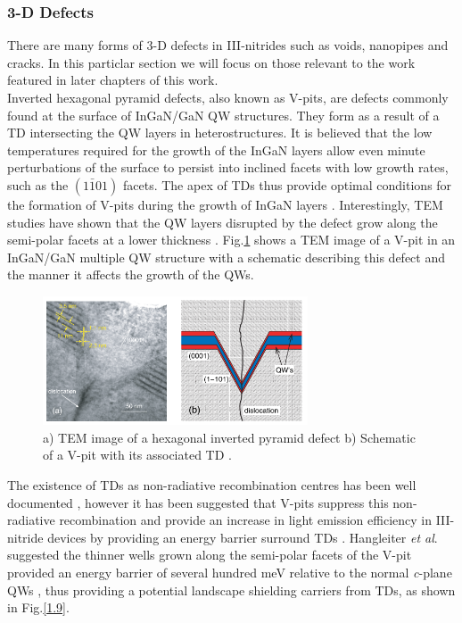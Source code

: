 \subsubsection{3-D Defects}
\label{v-pit section}
There are many forms of 3-D defects in III-nitrides such as voids, nanopipes and cracks. In this particlar section we will focus on those relevant to the work featured in later chapters of this work.\\
Inverted hexagonal pyramid defects, also known as V-pits, are defects commonly found at the surface of InGaN/GaN QW structures. They form as a result of a TD intersecting the QW layers in heterostructures. It is believed that the low temperatures required for the growth of the InGaN layers allow even minute perturbations of the surface to persist into inclined facets with low growth rates, such as the $(1\bar{1}01)$ facets. The apex of TDs thus provide optimal conditions for the formation of V-pits during the growth of InGaN layers \cite{Hangleiter2005}. Interestingly, TEM studies have shown that the QW layers disrupted by the defect grow along the semi-polar facets at a lower thickness \cite{Hangleiter2005,Han2013,Tsai2007}. Fig.\ref{1.8} shows a TEM image of a V-pit in an InGaN/GaN multiple QW structure with a schematic describing this defect and the manner it affects the growth of the QWs.

\begin{figure}[h]
	\centering
	\includegraphics[width=0.7\textwidth]{Figs/Ch1/vpit.png}
	\caption {a) TEM image of a hexagonal inverted pyramid defect b) Schematic  of a V-pit with its associated TD \cite{Hangleiter2005}.}
	\label{1.8}
\end{figure}
\FloatBarrier 

The existence of TDs as non-radiative recombination centres has been well documented \cite{Bennett2010b}, however it has been suggested that V-pits suppress this non-radiative recombination and provide an increase in light emission efficiency in III-nitride devices by providing an energy barrier surround TDs \cite{Hangleiter2005}. Hangleiter {\it et al}. suggested the thinner wells grown along the semi-polar facets of the V-pit provided an energy barrier of several hundred meV relative to the normal {\it c}-plane QWs \cite{Hangleiter2005}, thus providing a potential landscape shielding carriers from TDs, as shown in Fig.\ref{1.9}.

